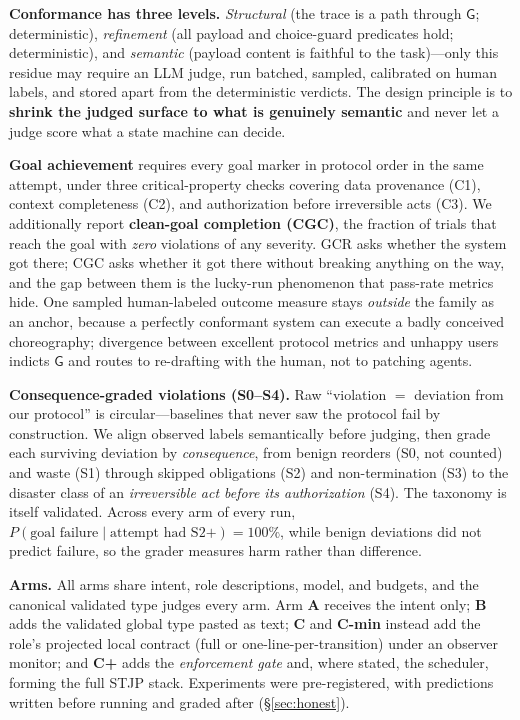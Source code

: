 \documentclass{article}
\newcommand{\gtG}{\mathsf{G}}
\newcommand{\stjp}{\textsc{STJP}}
\begin{document}
\textbf{Conformance has three levels.} \emph{Structural} (the trace is a path through $\gtG$; deterministic), \emph{refinement} (all payload and choice-guard predicates hold; deterministic), and \emph{semantic} (payload content is faithful to the task)---only this residue may require an LLM judge, run batched, sampled, calibrated on human labels, and stored apart from the deterministic verdicts. The design principle is to \textbf{shrink the judged surface to what is genuinely semantic} and never let a judge score what a state machine can decide.

\textbf{Goal achievement} requires every goal marker in protocol order in the same attempt, under three critical-property checks covering data provenance (C1), context completeness (C2), and authorization before irreversible acts (C3). We additionally report \textbf{clean-goal completion (CGC)}, the fraction of trials that reach the goal with \emph{zero} violations of any severity. GCR asks whether the system got there; CGC asks whether it got there without breaking anything on the way, and the gap between them is the lucky-run phenomenon that pass-rate metrics hide. One sampled human-labeled outcome measure stays \emph{outside} the family as an anchor, because a perfectly conformant system can execute a badly conceived choreography; divergence between excellent protocol metrics and unhappy users indicts $\gtG$ and routes to re-drafting with the human, not to patching agents.

\textbf{Consequence-graded violations (S0--S4).} Raw ``violation $=$ deviation from our protocol'' is circular---baselines that never saw the protocol fail by construction. We align observed labels semantically before judging, then grade each surviving deviation by \emph{consequence}, from benign reorders (S0, not counted) and waste (S1) through skipped obligations (S2) and non-termination (S3) to the disaster class of an \emph{irreversible act before its authorization} (S4). The taxonomy is itself validated. Across every arm of every run, $P(\text{goal failure}\mid\text{attempt had S2+})=100\%$, while benign deviations did not predict failure, so the grader measures harm rather than difference.

\textbf{Arms.} All arms share intent, role descriptions, model, and budgets, and the canonical validated type judges every arm. Arm \textbf{A} receives the intent only; \textbf{B} adds the validated global type pasted as text; \textbf{C} and \textbf{C-min} instead add the role's projected local contract (full or one-line-per-transition) under an observer monitor; and \textbf{C+} adds the \emph{enforcement gate} and, where stated, the scheduler, forming the full \stjp{} stack. Experiments were pre-registered, with predictions written before running and graded after (\S\ref{sec:honest}).
\end{document}
